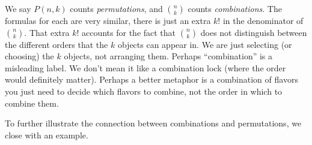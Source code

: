 \documentclass[11pt,]{book}
\theoremstyle{ptxplainnotitle}
\theoremstyle{ptxplaintitle}
\theoremstyle{ptxdefinitionnotitle}
\theoremstyle{ptxdefinitiontitle}
\theoremstyle{ptxdefinitionnotitle}
\theoremstyle{ptxdefinitiontitle}
\theoremstyle{ptxdefinitionnotitle}
\theoremstyle{ptxdefinitiontitle}
\theoremstyle{ptxdefinitiontitlenonumber}
\theoremstyle{ptxdefinitiontitlenonumber}
\numberwithin{equation}{chapter}
\begin{document}
\hypertarget{p-1539}{}%
We say \(P(n,k)\) counts \emph{permutations}, and \({n \choose k}\) counts \emph{combinations}. The formulas for each are very similar, there is just an extra \(k!\) in the denominator of \({n \choose k}\). That extra \(k!\) accounts for the fact that \({n \choose k}\) does not distinguish between the different orders that the \(k\) objects can appear in. We are just selecting (or choosing) the \(k\) objects, not arranging them. Perhaps ``combination'' is a misleading label. We don't mean it like a combination lock (where the order would definitely matter). Perhaps a better metaphor is a combination of flavors \textemdash{} you just need to decide which flavors to combine, not the order in which to combine them.%
\par
\hypertarget{p-1540}{}%
To further illustrate the connection between combinations and permutations, we close with an example.%
\end{document}
